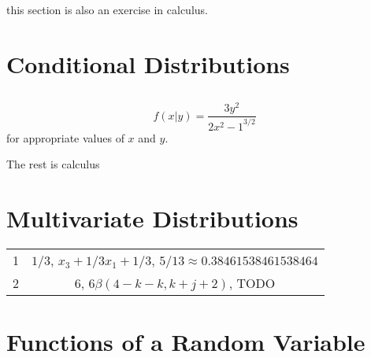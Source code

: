\documentclass[11pt,oneside,titlepage]{book}
\begin{document}
this section is also an exercise in calculus.

\section{Conditional Distributions}

\subsection{}

$$f(x|y) = \frac{3y^2}{2{x^2 - 1}^{3/2}}$$
for appropriate values of $x$ and $y$.

The rest is calculus

\section{Multivariate Distributions}

\begin{tabular}[center]{||c | c|| }
  \hline
  1 & $1/3$,  $x_3 + 1/3 x_1 + 1/3$, $5/13 \approx 0.38461538461538464$\\
  2 & $6$, $6 \beta(4 - k - k, k + j + 2)$, TODO\\
  \hline 
\end{tabular}


\section{Functions of a Random Variable}

\end{document}
